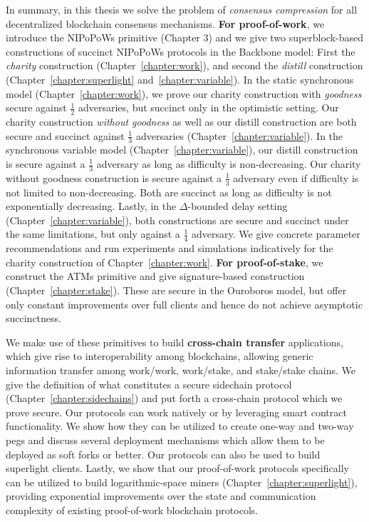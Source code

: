 In summary, in this thesis we solve the problem of \emph{consensus compression}
for all decentralized blockchain consensus mechanisms. \textbf{For
proof-of-work}, we introduce the NIPoPoWs primitive (Chapter 3) and we give two
superblock-based constructions of succinct NIPoPoWs protocols in the Backbone
model: First the \emph{charity} construction (Chapter~\ref{chapter:work}), and
second the \emph{distill} construction (Chapter~\ref{chapter:superlight}
and~\ref{chapter:variable}). In the static synchronous model
(Chapter~\ref{chapter:work}), we prove our charity construction with
\emph{goodness} secure against $\frac{1}{2}$ adversaries, but succinct only in
the optimistic setting. Our charity construction \emph{without goodness} as well
as our distill construction are both secure and succinct against $\frac{1}{3}$
adversaries (Chapter~\ref{chapter:variable}). In the synchronous variable model
(Chapter~\ref{chapter:variable}), our distill construction is secure against a
$\frac{1}{3}$ adversary as long as difficulty is non-decreasing. Our charity
without goodness construction is secure against a $\frac{1}{3}$ adversary even
if difficulty is not limited to non-decreasing. Both are succinct as long as
difficulty is not exponentially decreasing. Lastly, in the $\Delta$-bounded
delay setting (Chapter~\ref{chapter:variable}), both constructions are secure
and succinct under the same limitations, but only against a $\frac{1}{4}$
adversary. We give concrete parameter recommendations and run experiments and
simulations indicatively for the charity construction of
Chapter~\ref{chapter:work}. \textbf{For proof-of-stake}, we construct the ATMs
primitive and give signature-based construction (Chapter~\ref{chapter:stake}).
These are secure in the Ouroboros model, but offer only constant improvements
over full clients and hence do not achieve asymptotic succinctness.

We make use of these primitives to build \textbf{cross-chain transfer}
applications, which give rise to interoperability among blockchains, allowing
generic information transfer among work/work, work/stake, and stake/stake
chains. We give the definition of what constitutes a secure sidechain protocol
(Chapter~\ref{chapter:sidechains}) and put forth a cross-chain protocol which we
prove secure. Our protocols can work natively or by leveraging smart contract
functionality. We show how they can be utilized to create one-way and two-way
pegs and discuss several deployment mechanisms which allow them to be deployed
as soft forks or better. Our protocols can also be used to build superlight
clients. Lastly, we show that our proof-of-work protocols specifically can be
utilized to build logarithmic-space miners (Chapter~\ref{chapter:superlight}),
providing exponential improvements over the state and communication complexity
of existing proof-of-work blockchain protocols.

